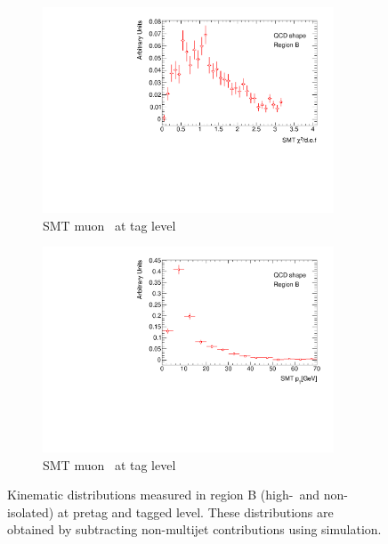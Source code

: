 \begin{figure}[htbp]
    \begin{subfigure}[b]{0.45\textwidth}
      \includegraphics[width=0.95\textwidth]{PartCrossSection/Plots/Electron/h_el_tag_SMT_chi2_wgt.pdf}
      \caption{SMT muon \xsd\ at tag level}\label{fig:CrossRegionBChi2}
    \end{subfigure}
    \;
    \begin{subfigure}[b]{0.45\textwidth}
      \includegraphics[width=0.95\textwidth]{PartCrossSection/Plots/Electron/h_el_tag_SMT_pt_wgt.pdf}
      \caption{SMT muon \pt\ at tag level}\label{fig:CrossRegionBSMTPt}
    \end{subfigure}
    \caption[Kinematic distributions measured in region B (high-\met\ and non-isolated) at pretag and tagged level.]{Kinematic distributions measured in region B (high-\met\ and non-isolated) at pretag and tagged level. These distributions are obtained by subtracting non-multijet contributions using simulation.}\label{fig:CrossRegionB}
\end{figure}

